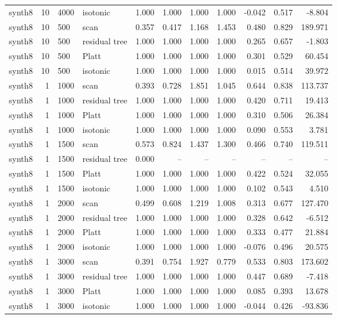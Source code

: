 \begin{tabular}{lrllrrrrrrr}
synth8 & 10 & 4000 & isotonic & 1.000 & 1.000 & 1.000 & 1.000 & -0.042 & 0.517 & -8.804 \\
synth8 & 10 & 500 & scan & 0.357 & 0.417 & 1.168 & 1.453 & 0.480 & 0.829 & 189.971 \\
synth8 & 10 & 500 & residual tree & 1.000 & 1.000 & 1.000 & 1.000 & 0.265 & 0.657 & -1.803 \\
synth8 & 10 & 500 & Platt & 1.000 & 1.000 & 1.000 & 1.000 & 0.301 & 0.529 & 60.454 \\
synth8 & 10 & 500 & isotonic & 1.000 & 1.000 & 1.000 & 1.000 & 0.015 & 0.514 & 39.972 \\
synth8 & 1 & 1000 & scan & 0.393 & 0.728 & 1.851 & 1.045 & 0.644 & 0.838 & 113.737 \\
synth8 & 1 & 1000 & residual tree & 1.000 & 1.000 & 1.000 & 1.000 & 0.420 & 0.711 & 19.413 \\
synth8 & 1 & 1000 & Platt & 1.000 & 1.000 & 1.000 & 1.000 & 0.310 & 0.506 & 26.384 \\
synth8 & 1 & 1000 & isotonic & 1.000 & 1.000 & 1.000 & 1.000 & 0.090 & 0.553 & 3.781 \\
synth8 & 1 & 1500 & scan & 0.573 & 0.824 & 1.437 & 1.300 & 0.466 & 0.740 & 119.511 \\
synth8 & 1 & 1500 & residual tree & 0.000 & -- & -- & -- & -- & -- & -- \\
synth8 & 1 & 1500 & Platt & 1.000 & 1.000 & 1.000 & 1.000 & 0.422 & 0.524 & 32.055 \\
synth8 & 1 & 1500 & isotonic & 1.000 & 1.000 & 1.000 & 1.000 & 0.102 & 0.543 & 4.510 \\
synth8 & 1 & 2000 & scan & 0.499 & 0.608 & 1.219 & 1.008 & 0.313 & 0.677 & 127.470 \\
synth8 & 1 & 2000 & residual tree & 1.000 & 1.000 & 1.000 & 1.000 & 0.328 & 0.642 & -6.512 \\
synth8 & 1 & 2000 & Platt & 1.000 & 1.000 & 1.000 & 1.000 & 0.333 & 0.477 & 21.884 \\
synth8 & 1 & 2000 & isotonic & 1.000 & 1.000 & 1.000 & 1.000 & -0.076 & 0.496 & 20.575 \\
synth8 & 1 & 3000 & scan & 0.391 & 0.754 & 1.927 & 0.779 & 0.533 & 0.803 & 173.602 \\
synth8 & 1 & 3000 & residual tree & 1.000 & 1.000 & 1.000 & 1.000 & 0.447 & 0.689 & -7.418 \\
synth8 & 1 & 3000 & Platt & 1.000 & 1.000 & 1.000 & 1.000 & 0.085 & 0.393 & 13.678 \\
synth8 & 1 & 3000 & isotonic & 1.000 & 1.000 & 1.000 & 1.000 & -0.044 & 0.426 & -93.836 \\

\end{tabular}
